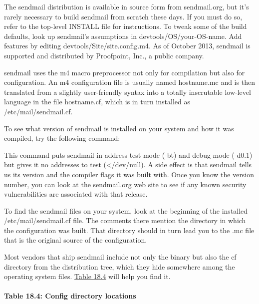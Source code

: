 {\protect\hypertarget{part0026_split_024.htmlux5cux23_idIndexMarker2493}{}{}\protect\hypertarget{part0026_split_024.htmlux5cux23_idIndexMarker2494}{}{}}The
{sendmail} distribution is available in source form from sendmail.org,
but it's rarely necessary to build {sendmail} from scratch these days.
If you must do so, refer to the top-level {INSTALL} file for
instructions. To tweak some of the build defaults, look up {sendmail}'s
assumptions in {devtools/OS/}{your-OS-name.} Add features by editing
{devtools/Site/site.config.m4}. As of October 2013, {sendmail} is
supported and distributed by Proofpoint, Inc., a public company.

{sendmail} uses the
\protect\hypertarget{part0026_split_024.htmlux5cux23_idIndexMarker2495}{}{}{m4}
macro preprocessor not only for compilation but also for configuration.
An {m4} configuration file is usually named {hostname}{.mc} and is then
translated from a slightly user-friendly syntax into a totally
inscrutable low-level language in the file {hostname}{.cf}, which is in
turn installed as {/etc/mail/sendmail.cf}.

To see what version of {sendmail} is installed on your system and how it
was compiled, try the following command:


This command puts {sendmail} in address test mode ({-bt}) and debug mode
({-d0.1}) but gives it no addresses to test ({\textless/dev/null}). A
side effect is that {sendmail} tells us its version and the compiler
flags it was built with. Once you know the version number, you can look
at the sendmail.org web site to see if any known security
vulnerabilities are associated with that release.

To find the {sendmail} files on your system, look at the beginning of
the installed {/etc/mail/sendmail.cf} file. The comments there mention
the directory in which the configuration was built. That directory
should in turn lead you to the {.mc} file that is the original source of
the configuration.

\protect\hypertarget{part0026_split_024.htmlux5cux23_idIndexMarker2496}{}{}Most
vendors that ship {sendmail} include not only the binary but also the
{cf} directory from the distribution tree, which they hide somewhere
among the operating system files.
\protect\hyperlink{part0026_split_024.htmlux5cux23_idTextAnchor1045}{Table
18.4} will help you find it.

\paragraph[{Table 18.4: }Config directory
locations]{\texorpdfstring{{Table 18.4:
}\protect\hypertarget{part0026_split_024.htmlux5cux23_idTextAnchor1045}{}{}Config
directory locations}{Table 18.4: Config directory locations}}

